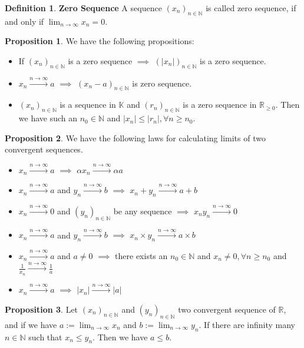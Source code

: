 \documentclass{article}
\theoremstyle{definition}
\newtheorem{defi}{Definition}[subsection]
\newtheorem{prop}{Proposition}[subsection]
\begin{document}
\begin{defi}
\textbf{Zero Sequence} A sequence $(x_n)_{n\in\mathbb{N}}$ is called zero sequence, if and only if $\lim_{n\to\infty}x_n=0$.
\end{defi}

\begin{prop}
We have the following propositions:
\begin{itemize}
    \item If $(x_n)_{n\in\mathbb{N}}$ is a zero sequence $\implies$ $(|x_n|)_{n\in\mathbb{N}}$ is a zero sequence.
    \item $x_n \xrightarrow{n\to\infty}a$ $\implies$ $(x_n-a)_{n\in\mathbb{N}}$ is zero sequence.
    \item $(x_n)_{n\in\mathbb{N}}$ is a sequence in $\mathbb{K}$ and $(r_n)_{n\in\mathbb{N}}$ is a zero sequence in $\mathbb{R}_{\geq0}$. Then we have such an $n_0\in\mathbb{N}$ and $|x_n|\leq |r_n|, \forall n \geq n_0$.
\end{itemize}
\end{prop}

\begin{prop}
We have the following laws for calculating limits of two convergent sequences.
\begin{itemize}
\item $x_n \xrightarrow{n\to\infty}a$ $\implies$ $\alpha x_n \xrightarrow{n\to\infty}\alpha a$
\item $x_n \xrightarrow{n\to\infty}a$ and $y_n \xrightarrow{n\to\infty}b$ $\implies$ $ x_n+y_n \xrightarrow{n\to\infty}a+b $
\item $x_n \xrightarrow{n\to\infty}0$ and $ (y_n)_{n\in\mathbb{N}} $ be any sequence $\implies$ $x_n y_n \xrightarrow{n\to\infty}0$
\item $x_n \xrightarrow{n\to\infty}a$ and $y_n \xrightarrow{n\to\infty}b$ $\implies$ $ x_n\times y_n \xrightarrow{n\to\infty}a \times b $
\item $x_n \xrightarrow{n\to\infty}a$ and $a \neq 0$ $\implies$ there exists an $n_0\in\mathbb{N}$ and $x_n \neq 0, \forall n \geq n_0$ and $\frac{1}{x_n} \xrightarrow{n\to\infty}\frac{1}{a}$
\item $x_n \xrightarrow{n\to\infty}a$ $\implies$ $|x_n| \xrightarrow{n\to\infty}|a|$
\end{itemize}
\end{prop}

\begin{prop}
Let $(x_n)_{n\in\mathbb{N}}$ and $(y_n)_{n\in\mathbb{N}}$ two convergent sequence of $\mathbb{R}$, and if we have $a:=\lim_{n\to\infty}x_{n}$ and $b:=\lim_{n\to\infty}y_{n}$. If there are infinity many $n\in\mathbb{N}$ such that $x_n\leq y_n$. Then we have $a\leq b$.
\end{prop}
\end{document}
